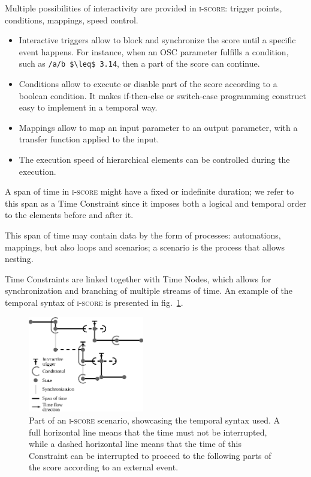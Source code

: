 \documentclass{article}
\newcommand*{\iscore}{\textsc{i-score}\xspace}
\begin{document}
Multiple possibilities of interactivity are provided in \iscore: trigger points, conditions, 
mappings, speed control.
\begin{itemize}
    \item Interactive triggers allow to block and synchronize the score until a specific event happens.
    For instance, when an OSC parameter fulfills a condition, such as  \lstinline[mathescape]!/a/b $\leq$ 3.14!, then 
    a part of the score can continue.
    \item Conditions allow to execute or disable part of the score according to a boolean condition.
    It makes if-then-else or switch-case programming construct easy to implement in a temporal way.
    \item Mappings allow to map an input parameter to an output parameter, with a transfer function applied to the input.
    \item The execution speed of hierarchical elements can be controlled during the execution.
\end{itemize}

A span of time in \iscore might have a fixed or indefinite duration;
we refer to this span as a Time Constraint since it imposes both a logical and temporal order to the elements before and after it.
 
This span of time may contain data by the form of processes: automations, mappings, but also loops and scenarios; a scenario is the process that allows nesting. 

Time Constraints are linked together with Time Nodes, which allows for synchronization and branching of multiple streams of time.
An example of the temporal syntax of \iscore is presented in fig.~\ref{fig.iscore-example}.

\begin{figure}
	\centering
	\includegraphics[width=0.45\textwidth]{figures/iscore-example.eps}
	\caption{Part of an \iscore scenario, showcasing the temporal syntax used. 
		A full horizontal line means that the time must not be interrupted, 
		while a dashed horizontal line means that the time of this Constraint can be interrupted to proceed 
		to the following parts of the score according to an external event.}
	\label{fig.iscore-example}
\end{figure}
\end{document}
